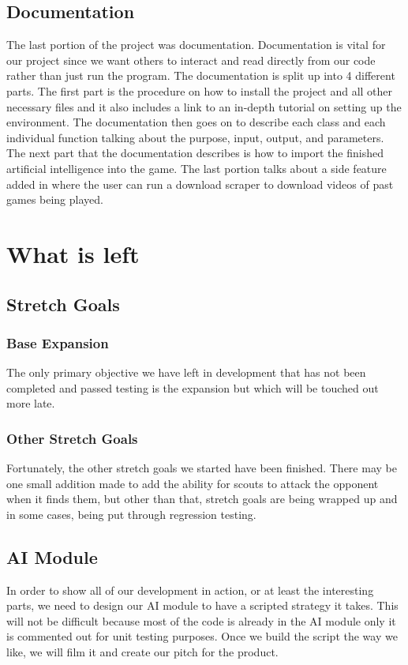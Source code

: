 \documentclass[10pt,letterpaper,onecolumn,draftclsnofoot]{IEEEtran}
\begin{document}
\subsection{Documentation}
The last portion of the project was documentation. Documentation is vital for our project since we want others to interact and read directly from our code rather than just run the program. The documentation is split up into 4 different parts. The first part is the procedure on how to install the project and all other necessary files and it also includes a link to an in-depth tutorial on setting up the environment. The documentation then goes on to describe each class and each individual function talking about the purpose, input, output, and parameters. The next part that the documentation describes is how to import the finished artificial intelligence into the game. The last portion talks about a side feature added in where the user can run a download scraper to download videos of past games being played.


\section{What is left}
\subsection{Stretch Goals}

\subsubsection{Base Expansion}
The only primary objective we have left in development that has not been completed and passed testing is the expansion but which will be touched out more late. 
\subsubsection{Other Stretch Goals}
Fortunately, the other stretch goals we started have been finished. There may be one small addition made to add the ability for scouts to attack the opponent when it finds them, but other than that, stretch goals are being wrapped up and in some cases, being put through regression testing. 
\subsection{AI Module}
In order to show all of our development in action, or at least the interesting parts, we need to design our AI module to have a scripted strategy it takes. This will not be difficult because most of the code is already in the AI module only it is commented out for unit testing purposes. Once we build the script the way we like, we will film it and create our pitch for the product. 
\end{document}
